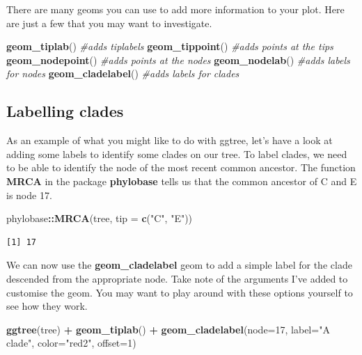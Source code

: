 \documentclass[
]{book}
\newenvironment{Shaded}{\begin{snugshade}}{\end{snugshade}}
\newcommand{\CommentTok}[1]{\textcolor[rgb]{0.56,0.35,0.01}{\textit{#1}}}
\newcommand{\DataTypeTok}[1]{\textcolor[rgb]{0.13,0.29,0.53}{#1}}
\newcommand{\DecValTok}[1]{\textcolor[rgb]{0.00,0.00,0.81}{#1}}
\newcommand{\KeywordTok}[1]{\textcolor[rgb]{0.13,0.29,0.53}{\textbf{#1}}}
\newcommand{\NormalTok}[1]{#1}
\newcommand{\OperatorTok}[1]{\textcolor[rgb]{0.81,0.36,0.00}{\textbf{#1}}}
\newcommand{\StringTok}[1]{\textcolor[rgb]{0.31,0.60,0.02}{#1}}
\begin{document}
There are many geoms you can use to add more information to your plot. Here are just a few that you may want to investigate.

\begin{Shaded}
\begin{Highlighting}[]
\KeywordTok{geom\_tiplab}\NormalTok{() }\CommentTok{\#adds tiplabels}
\KeywordTok{geom\_tippoint}\NormalTok{() }\CommentTok{\#adds points at the tips}
\KeywordTok{geom\_nodepoint}\NormalTok{() }\CommentTok{\#adds points at the nodes}
\KeywordTok{geom\_nodelab}\NormalTok{() }\CommentTok{\#adds labels for nodes}
\KeywordTok{geom\_cladelabel}\NormalTok{() }\CommentTok{\#adds labels for clades}
\end{Highlighting}
\end{Shaded}

\hypertarget{labelling-clades}{%
\subsection{Labelling clades}\label{labelling-clades}}

As an example of what you might like to do with ggtree, let's have a look at adding some labels to identify some clades on our tree. To label clades, we need to be able to identify the node of the most recent common ancestor. The function \textbf{MRCA} in the package \textbf{phylobase} \citep{phylobase} tells us that the common ancestor of C and E is node 17.

\begin{Shaded}
\begin{Highlighting}[]
\NormalTok{phylobase}\OperatorTok{::}\KeywordTok{MRCA}\NormalTok{(tree, }\DataTypeTok{tip =} \KeywordTok{c}\NormalTok{(}\StringTok{"C"}\NormalTok{, }\StringTok{"E"}\NormalTok{))}
\end{Highlighting}
\end{Shaded}

\begin{verbatim}
[1] 17
\end{verbatim}

We can now use the \textbf{geom\_cladelabel} geom to add a simple label for the clade descended from the appropriate node. Take note of the arguments I've added to customise the geom. You may want to play around with these options yourself to see how they work.

\begin{Shaded}
\begin{Highlighting}[]
\KeywordTok{ggtree}\NormalTok{(tree) }\OperatorTok{+}\StringTok{ }
\StringTok{  }\KeywordTok{geom\_tiplab}\NormalTok{() }\OperatorTok{+}\StringTok{ }
\StringTok{  }\KeywordTok{geom\_cladelabel}\NormalTok{(}\DataTypeTok{node=}\DecValTok{17}\NormalTok{, }\DataTypeTok{label=}\StringTok{"A clade"}\NormalTok{, }
                  \DataTypeTok{color=}\StringTok{"red2"}\NormalTok{, }\DataTypeTok{offset=}\DecValTok{1}\NormalTok{)}
\end{Highlighting}
\end{Shaded}
\end{document}

